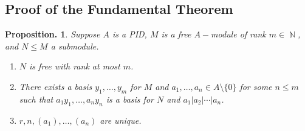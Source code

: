 \documentclass[11pt, a4paper]{memoir}
\DeclareMathOperator{\N}{{\mathbb{N}}}
\theoremstyle{change}
\newtheorem{proposition}[theorem]{Proposition.}
\theoremstyle{plain}
\theoremstyle{nonumberplain}
\numberwithin{equation}{section}
\begin{document}
\subsection{Proof of the Fundamental Theorem}
\begin{proposition}\label{ftpid-prop}
    Suppose $A$ is a PID, $M$ is a free $A-$module of rank $m\in\N$, and $N\leq M$ a submodule.
    \begin{enumerate}[nolistsep,label=(\roman*)]
        \item $N$ is free with rank at most $m$.
        \item There exists a basis $y_1,\ldots,y_m$ for $M$ and $a_1,\ldots,a_n\in A\setminus\{0\}$ for some $n\leq m$ such that $a_1y_1,\ldots,a_ny_n$ is a basis for $N$ and $a_1|a_2|\cdots|a_n$.
        \item $r,n,(a_1),\ldots,(a_n)$ are unique.
    \end{enumerate}
\end{proposition}
\end{document}
